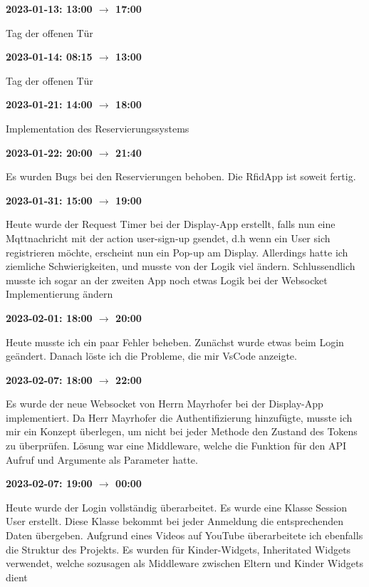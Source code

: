 \vspace{0.5cm} \textbf{2023-01-13: 13:00 $\rightarrow$ 17:00} 

Tag der offenen Tür

\vspace{0.5cm} \textbf{2023-01-14: 08:15 $\rightarrow$ 13:00} 

Tag der offenen Tür

\vspace{0.5cm} \textbf{2023-01-21: 14:00 $\rightarrow$ 18:00} 

Implementation des Reservierungssystems

\vspace{0.5cm} \textbf{2023-01-22: 20:00 $\rightarrow$ 21:40} 

Es wurden Bugs bei den Reservierungen behoben. Die RfidApp ist soweit fertig.

\vspace{0.5cm} \textbf{2023-01-31: 15:00 $\rightarrow$ 19:00} 

Heute wurde der Request Timer bei der Display-App erstellt, falls nun  eine Mqttnachricht mit der action user-sign-up gsendet, d.h wenn ein User sich registrieren
möchte, erscheint nun ein Pop-up am Display. Allerdings hatte ich ziemliche Schwierigkeiten, und musste von der Logik viel ändern.
Schlussendlich musste ich sogar an der zweiten App noch etwas Logik bei
der Websocket Implementierung ändern

\vspace{0.5cm} \textbf{2023-02-01: 18:00 $\rightarrow$ 20:00} 

Heute musste ich ein
paar Fehler beheben. Zunächst wurde etwas beim Login geändert. Danach
l\"oste ich die Probleme, die mir VsCode anzeigte.

\vspace{0.5cm} \textbf{2023-02-07: 18:00 $\rightarrow$ 22:00} 

Es wurde der neue
Websocket von Herrn Mayrhofer bei der Display-App implementiert. Da Herr
Mayrhofer die Authentifizierung hinzufügte, musste ich mir ein Konzept
überlegen, um nicht bei jeder Methode den Zustand des Tokens zu
überprüfen. Lösung war eine Middleware, welche die Funktion für den API
Aufruf und Argumente als Parameter hatte.

\vspace{0.5cm} \textbf{2023-02-07: 19:00 $\rightarrow$ 00:00} 

Heute wurde der Login
vollständig überarbeitet. Es wurde eine Klasse Session User erstellt.
Diese Klasse bekommt bei jeder Anmeldung die entsprechenden Daten
übergeben. Aufgrund eines Videos auf YouTube überarbeitete ich ebenfalls
die Struktur des Projekts. Es wurden für Kinder-Widgets, Inheritated
Widgets verwendet, welche sozusagen als Middleware zwischen Eltern und
Kinder Widgets dient

